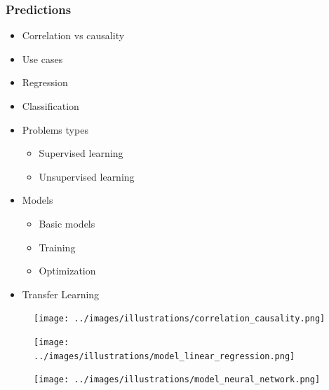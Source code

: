 \begin{frame}\frametitle{Predictions}
   \begin{minipage}{0.56\linewidth}
      \begin{itemize}
         \item Correlation vs causality
         \item Use cases
         \item Regression
         \item Classification
         \item Problems types
         \begin{itemize}
            \item Supervised learning
            \item Unsupervised learning
         \end{itemize}
         \item Models
         \begin{itemize}
            \item Basic models
            \item Training
            \item Optimization
         \end{itemize}
         \item Transfer Learning
      \end{itemize}
   \end{minipage}
   \begin{minipage}{0.4\linewidth}
      \begin{figure}[H]
         \texttt{[image: ../images/illustrations/correlation\_causality.png]}
      \end{figure}
      \begin{figure}[H]
         \texttt{[image: ../images/illustrations/model\_linear\_regression.png]}
      \end{figure}
      \begin{figure}[H]
         \texttt{[image: ../images/illustrations/model\_neural\_network.png]}
      \end{figure}
   \end{minipage}

\end{frame}




